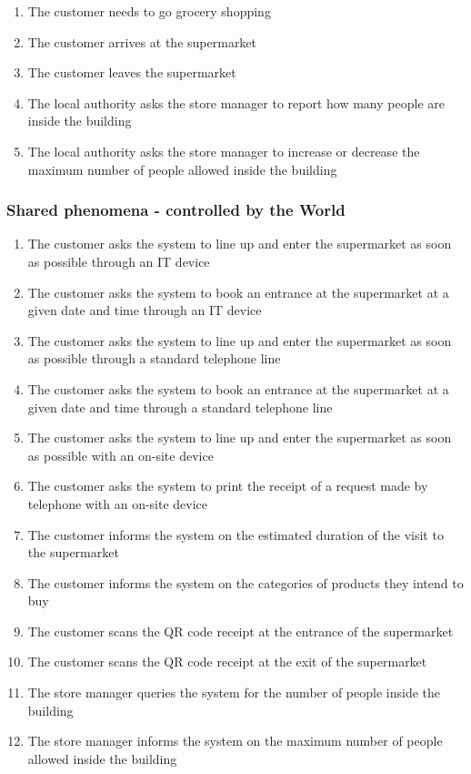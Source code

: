 \documentclass[../../main.tex]{subfiles}
\begin{document}
\begin{enumerate}
  \item The customer needs to go grocery shopping
  \item The customer arrives at the supermarket
  \item The customer leaves the supermarket
  \item The local authority asks the store manager to report how many people are
  inside the building
  \item The local authority asks the store manager to increase or decrease the maximum number
  of people allowed inside the building
\end{enumerate}

\subsubsection{Shared phenomena - controlled by the World}

\begin{enumerate}
  \item The customer asks the system to line up and enter the supermarket as
  soon as possible through an IT device
  \item The customer asks the system to book an entrance at the supermarket at a
  given date and time through an IT device
  \item The customer asks the system to line up and enter the supermarket as
  soon as possible through a standard telephone line
  \item The customer asks the system to book an entrance at the supermarket at a
  given date and time through a standard telephone line
  \item The customer asks the system to line up and enter the supermarket as
  soon as possible with an on-site device
  \item The customer asks the system to print the receipt of a request made by
  telephone with an on-site device
  \item The customer informs the system on the estimated duration of the visit
  to the supermarket
  \item The customer informs the system on the categories of products they
  intend to buy
  \item The customer scans the QR code receipt at the entrance of the
  supermarket
  \item The customer scans the QR code receipt at the exit of the supermarket
  \item The store manager queries the system for the number of people inside the
  building
  \item The store manager informs the system on the maximum number of people
  allowed inside the building
\end{enumerate}
\end{document}
